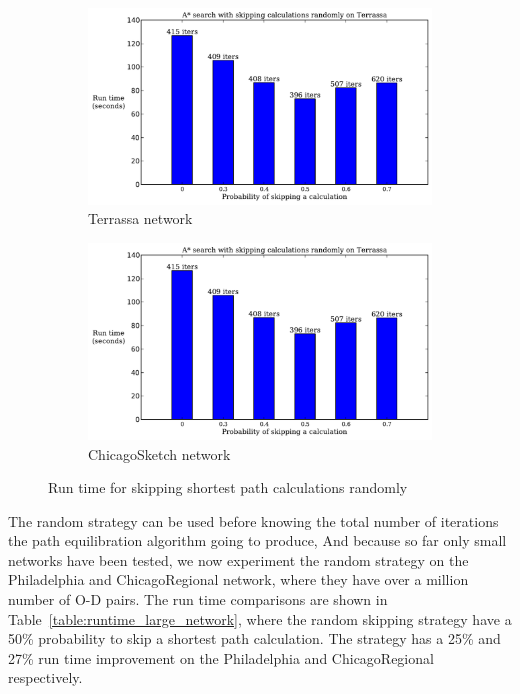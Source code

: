 \begin{figure}[H]
    \centering
    \begin{subfigure}{.5\textwidth}
        \centering
        \includegraphics[page=1,width=\textwidth]{img/random_time}
        \caption{Terrassa network}
        \label{fig:terrassa_skip_n}
    \end{subfigure}%
    \begin{subfigure}{.5\textwidth}
        \centering
        \includegraphics[page=2,width=\textwidth]{img/random_time}
        \caption{ChicagoSketch network}
        \label{fig:chicago_skip_n}
    \end{subfigure}
    \caption{Run time for skipping shortest path calculations randomly}
    \label{fig:skip_n}
\end{figure}

The random strategy can be used before knowing the total number of iterations the path equilibration algorithm going to produce,
And because so far only small networks have been tested,
we now experiment the random strategy on the Philadelphia and ChicagoRegional network, where they have over a million number of O-D pairs.
The run time comparisons are shown in Table~\ref{table:runtime_large_network},
where the random skipping strategy have a 50\% probability to skip a shortest path calculation.
The strategy has a 25\% and 27\% run time improvement on the Philadelphia and ChicagoRegional respectively.

